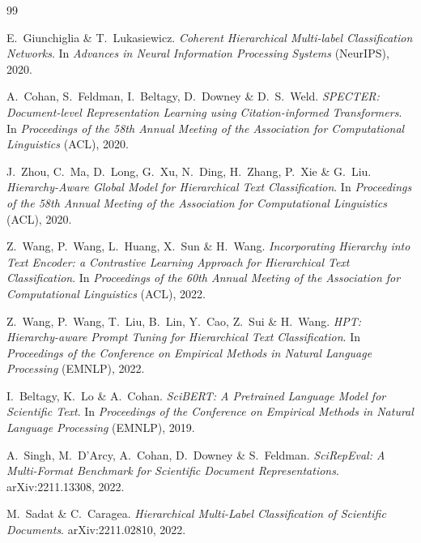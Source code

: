 \documentclass[11pt,a4paper,twoside]{article}
\begin{document}

\begin{thebibliography}{99}

E.~Giunchiglia \& T.~Lukasiewicz.
\textit{Coherent Hierarchical Multi-label Classification Networks}.
In \textit{Advances in Neural Information Processing Systems} (NeurIPS), 2020.

A.~Cohan, S.~Feldman, I.~Beltagy, D.~Downey \& D.~S.~Weld.
\textit{SPECTER: Document-level Representation Learning using Citation-informed
Transformers}.
In \textit{Proceedings of the 58th Annual Meeting of the Association for
Computational Linguistics} (ACL), 2020.

J.~Zhou, C.~Ma, D.~Long, G.~Xu, N.~Ding, H.~Zhang, P.~Xie \& G.~Liu.
\textit{Hierarchy-Aware Global Model for Hierarchical Text Classification}.
In \textit{Proceedings of the 58th Annual Meeting of the Association for
Computational Linguistics} (ACL), 2020.

Z.~Wang, P.~Wang, L.~Huang, X.~Sun \& H.~Wang.
\textit{Incorporating Hierarchy into Text Encoder: a Contrastive Learning
Approach for Hierarchical Text Classification}.
In \textit{Proceedings of the 60th Annual Meeting of the Association for
Computational Linguistics} (ACL), 2022.

Z.~Wang, P.~Wang, T.~Liu, B.~Lin, Y.~Cao, Z.~Sui \& H.~Wang.
\textit{HPT: Hierarchy-aware Prompt Tuning for Hierarchical Text Classification}.
In \textit{Proceedings of the Conference on Empirical Methods in Natural Language
Processing} (EMNLP), 2022.

I.~Beltagy, K.~Lo \& A.~Cohan.
\textit{SciBERT: A Pretrained Language Model for Scientific Text}.
In \textit{Proceedings of the Conference on Empirical Methods in Natural Language
Processing} (EMNLP), 2019.

A.~Singh, M.~D'Arcy, A.~Cohan, D.~Downey \& S.~Feldman.
\textit{SciRepEval: A Multi-Format Benchmark for Scientific Document Representations}.
arXiv:2211.13308, 2022.

M.~Sadat \& C.~Caragea.
\textit{Hierarchical Multi-Label Classification of Scientific Documents}.
arXiv:2211.02810, 2022.

\end{thebibliography}
\end{document}
